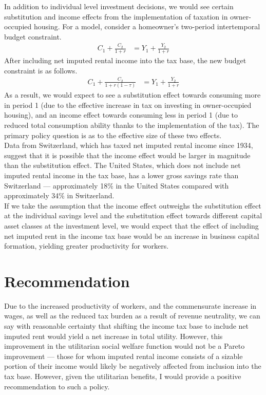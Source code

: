 \documentclass[12pt]{extarticle}
\begin{document}
  In addition to individual level investment decisions, we would see certain substitution and income effects from the implementation of taxation in owner-occupied housing. For a model, consider a homeowner's two-period intertemporal budget constraint.
  \begin{align*}
    C_1 + \frac{C_2}{1+r} &= Y_1 + \frac{Y_2}{1+r}
  \end{align*}
  After including net imputed rental income into the tax base, the new budget constraint is as follows.
  \begin{align*}
    C_1 + \frac{C_2}{1+r(1-\tau)} &= Y_1 + \frac{Y_2}{1+r}
  \end{align*}
  As a result, we would expect to see a substitution effect towards consuming more in period 1 (due to the effective increase in tax on investing in owner-occupied housing), and an income effect towards consuming less in period 1 (due to reduced total consumption ability thanks to the implementation of the tax). The primary policy question is as to the effective size of these two effects.\\

  Data from Switzerland, which has taxed net imputed rental income since 1934,\supercite{switzerland_imputed} suggest that it is possible that the income effect would be larger in magnitude than the substitution effect. The United States, which does not include net imputed rental income in the tax base, has a lower gross savings rate than Switzerland --- approximately 18\% in the United States\supercite{switzerland_savings} compared with approximately 34\% in Switzerland.\supercite{switzerland_savings}\\

  If we take the assumption that the income effect outweighs the substitution effect at the individual savings level and the substitution effect towards different capital asset classes at the investment level, we would expect that the effect of including net imputed rent in the income tax base would be an increase in business capital formation, yielding greater productivity for workers.
  \section*{Recommendation}%
  Due to the increased productivity of workers, and the commensurate increase in wages, as well as the reduced tax burden as a result of revenue neutrality, we can say with reasonable certainty that shifting the income tax base to include net imputed rent would yield a net increase in total utility. However, this improvement in the utilitarian social welfare function would not be a Pareto improvement --- those for whom imputed rental income consists of a sizable portion of their income would likely be negatively affected from inclusion into the tax base. However, given the utilitarian benefits, I would provide a positive recommendation to such a policy.
  \printbibliography
\end{document}
